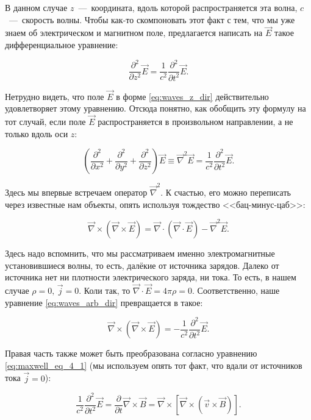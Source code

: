 \documentclass[a4paper,12pt]{article}
\newcommand{\pt}{\partial}
\newcommand{\vn}{\vec{\nabla}}
\begin{document}
В данном случае $z$~---~координата, вдоль которой распространяется эта
волна, $c$~---~скорость волны. Чтобы как-то скомпоновать этот факт с
тем, что мы уже знаем об электрическом и магнитном поле, предлагается
написать на $\vec{E}$ такое дифференциальное уравнение: 

\begin{equation}
  \label{eq:waves_diff_eq}
  \frac{\pt^2}{\pt z^2} \vec{E} = \frac{1}{c^2} \frac{\pt^2}{\pt t^2} \vec{E}.
\end{equation}

Нетрудно видеть, что поле $\vec{E}$ в форме \eqref{eq:waves_z_dir}
действительно удовлетворяет этому уравнению. Отсюда понятно, как
обобщить эту формулу на тот случай, если поле $\vec{E}$
распространяется в произвольном направлении, а не только вдоль оси
$z$: 

\begin{equation}
  \label{eq:waves_arb_dir}
   \left( \frac{\pt^2}{\pt x^2} + \frac{\pt^2}{\pt y^2} + \frac{\pt^2}{\pt
     z^2} \right) \vec{E} \equiv \vn^2 \vec{E} = \frac{1}{c^2} \frac{\pt^2}{\pt t^2} \vec{E}.
\end{equation}

Здесь мы впервые встречаем оператор $\vn^2$. К счастью, его можно
переписать через известные нам объекты, опять используя тождество
<<бац-минус-цаб>>: 

\begin{equation}
  \label{eq:bac_cab_2}
  \vn \times \left( \vn \times \vec{E}  \right) = \vn \cdot \left( \vn
  \cdot \vec{E} \right) - \vn^2 \vec{E}.
\end{equation}

Здесь надо вспомнить, что мы рассматриваем именно электромагнитные
установившиеся волны, то есть, далёкие от источника зарядов. Далеко от
источника нет ни плотности электрического заряда, ни тока. То есть, в
нашем случае $\rho=0, \, \vec{j}=0$. Коли так, то $\vn \cdot \vec{E}
= 4 \pi \rho=0$. Соответственно, наше уравнение
\eqref{eq:waves_arb_dir} превращается в такое: 

\begin{equation}
  \label{eq:waves_eq_2}
  \vn \times \left( \vn \times \vec{E}  \right) = - \frac{1}{c^2} \frac{\pt^2}{\pt t^2} \vec{E}.
\end{equation}

Правая часть также может быть преобразована согласно уравнению
\eqref{eq:maxwell_eq_4_1} (мы используем опять тот факт, что вдали
от источников тока $\vec{j}=0$):

\begin{equation}
  \label{eq:waves_eq_3}
  \frac{1}{c^2} \frac{\pt^2}{\pt t^2} \vec{E} =
  \frac{\pt}{\pt t} \vn \times \vec{B} =  \vn \times \left[
  \vn \times \left( \vec{v} \times \vec{B}  \right)\right].
\end{equation}
\end{document}
